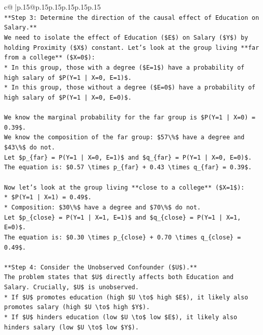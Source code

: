 \documentclass{article}
\begin{document}
{\begin{supertabular}{c@{$\;$}|p{.15\linewidth}@{}p{.15\linewidth}p{.15\linewidth}p{.15\linewidth}p{.15\linewidth}p{.15\linewidth}}
{{{\\ 
\texttt{**Step 3: Determine the direction of the causal effect of Education on Salary.**} \\
\texttt{We need to isolate the effect of Education (\$E\$) on Salary (\$Y\$) by holding Proximity (\$X\$) constant. Let's look at the group living **far from a college** (\$X=0\$):} \\
\texttt{*   In this group, those with a degree (\$E=1\$) have a probability of high salary of \$P(Y=1 | X=0, E=1)\$.} \\
\texttt{*   In this group, those without a degree (\$E=0\$) have a probability of high salary of \$P(Y=1 | X=0, E=0)\$.} \\
\\ 
\texttt{We know the marginal probability for the far group is \$P(Y=1 | X=0) = 0.39\$.} \\
\texttt{We know the composition of the far group: \$57\textbackslash{}\%\$ have a degree and \$43\textbackslash{}\%\$ do not.} \\
\texttt{Let \$p\_\{far\} = P(Y=1 | X=0, E=1)\$ and \$q\_\{far\} = P(Y=1 | X=0, E=0)\$.} \\
\texttt{The equation is: \$0.57 \textbackslash{}times p\_\{far\} + 0.43 \textbackslash{}times q\_\{far\} = 0.39\$.} \\
\\ 
\texttt{Now let's look at the group living **close to a college** (\$X=1\$):} \\
\texttt{*   \$P(Y=1 | X=1) = 0.49\$.} \\
\texttt{*   Composition: \$30\textbackslash{}\%\$ have a degree and \$70\textbackslash{}\%\$ do not.} \\
\texttt{Let \$p\_\{close\} = P(Y=1 | X=1, E=1)\$ and \$q\_\{close\} = P(Y=1 | X=1, E=0)\$.} \\
\texttt{The equation is: \$0.30 \textbackslash{}times p\_\{close\} + 0.70 \textbackslash{}times q\_\{close\} = 0.49\$.} \\
\\ 
\texttt{**Step 4: Consider the Unobserved Confounder (\$U\$).**} \\
\texttt{The problem states that \$U\$ directly affects both Education and Salary. Crucially, \$U\$ is unobserved.} \\
\texttt{*   If \$U\$ promotes education (high \$U \textbackslash{}to\$ high \$E\$), it likely also promotes salary (high \$U \textbackslash{}to\$ high \$Y\$).} \\
\texttt{*   If \$U\$ hinders education (low \$U \textbackslash{}to\$ low \$E\$), it likely also hinders salary (low \$U \textbackslash{}to\$ low \$Y\$).} \\
}}}
\end{supertabular}}
\end{document}
